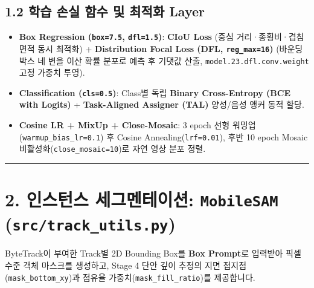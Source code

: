 \documentclass[10.5pt,a4paper]{article}
\begin{document}
\subsection{1.2 학습 손실 함수 및 최적화 Layer}
\begin{itemize}[leftmargin=1.5em,itemsep=2pt]
\item \textbf{Box Regression (\texttt{box=7.\allowbreak{}5}, \texttt{dfl=1.\allowbreak{}5})}: \textbf{CIoU Loss} (중심 거리·종횡비·겹침 면적 동시 최적화) + \textbf{Distribution Focal Loss (DFL, \texttt{reg\_\allowbreak{}max=16})} (바운딩 박스 네 변을 이산 확률 분포로 예측 후 기댓값 산출, \texttt{model.\allowbreak{}23.\allowbreak{}dfl.\allowbreak{}conv.\allowbreak{}weight} 고정 가중치 투영).
\item \textbf{Classification (\texttt{cls=0.\allowbreak{}5})}: Class별 독립 \textbf{Binary Cross-Entropy (BCE with Logits)} + \textbf{Task-Aligned Assigner (TAL)} 양성/음성 앵커 동적 할당.
\item \textbf{Cosine LR + MixUp + Close-Mosaic}: 3 epoch 선형 워밍업(\texttt{warmup\_\allowbreak{}bias\_\allowbreak{}lr=0.\allowbreak{}1}) 후 Cosine Annealing(\texttt{lrf=0.\allowbreak{}01}), 후반 10 epoch Mosaic 비활성화(\texttt{close\_\allowbreak{}mosaic=10})로 자연 영상 분포 정렬.
\end{itemize}

\par\noindent\rule{\textwidth}{0.4pt}\par\medskip

\section{2. 인스턴스 세그멘테이션: \texttt{MobileSAM} (\texttt{src/\allowbreak{}track\_\allowbreak{}utils.\allowbreak{}py})}

ByteTrack이 부여한 Track별 2D Bounding Box를 \textbf{Box Prompt}로 입력받아 픽셀 수준 객체 마스크를 생성하고, Stage 4 단안 깊이 추정의 지면 접지점(\texttt{mask\_\allowbreak{}bottom\_\allowbreak{}xy})과 점유율 가중치(\texttt{mask\_\allowbreak{}fill\_\allowbreak{}ratio})를 제공합니다.
\end{document}
